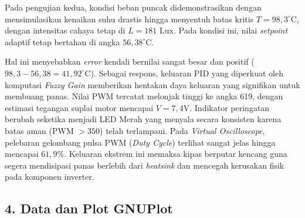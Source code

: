 \documentclass[11pt,a4paper]{article}
\begin{document}
Pada pengujian kedua, kondisi beban puncak didemonstrasikan dengan mensimulasikan kenaikan suhu drastis hingga menyentuh batas kritis $T = 98{,}3^\circ\text{C}$, dengan intensitas cahaya tetap di $L = 181\text{ Lux}$. Pada kondisi ini, nilai \textit{setpoint} adaptif tetap bertahan di angka $56{,}38^\circ\text{C}$.

Hal ini menyebabkan \textit{error} kendali bernilai sangat besar dan positif ($98{,}3 - 56{,}38 = 41{,}92^\circ\text{C}$). Sebagai respons, keluaran PID yang diperkuat oleh komputasi \textit{Fuzzy Gain} memberikan hentakan daya keluaran yang signifikan untuk membuang panas. Nilai PWM tercatat melonjak tinggi ke angka 619, dengan estimasi tegangan suplai motor mencapai $V = 7{,}4\text{V}$. Indikator peringatan berubah seketika menjadi LED Merah yang menyala secara konsisten karena batas aman (PWM $> 350$) telah terlampaui. Pada \textit{Virtual Oscilloscope}, pelebaran gelombang pulsa PWM (\textit{Duty Cycle}) terlihat sangat jelas hingga mencapai $61{,}9\%$. Keluaran ekstrem ini memaksa kipas berputar kencang guna segera mendisipasi panas berlebih dari \textit{heatsink} dan mencegah kerusakan fisik pada komponen inverter.



\subsection*{4. Data dan Plot GNUPlot}
\end{document}
